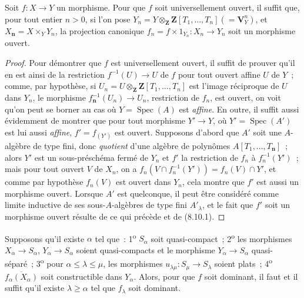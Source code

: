 \begin{corollary}[8.10.2]
\label{IV.8.10.2-fr}
Soit $f:X\to Y$ un morphisme. Pour que $f$ soit universellement ouvert, il
suffit que, pour tout entier $n>0$, si l'on pose
$Y_n=Y\otimes_{\mathbf Z}\mathbf Z[T_1,\ldots,T_n](=\mathbf V_Y^n)$, et
$X_{\boldsymbol{n}}=X\times_YY_n$, la projection canonique
$f_n=f\times1_{Y_n}:X_n\to Y_n$ soit un morphisme ouvert.
\end{corollary}

\begin{proof}
Pour démontrer que $f$ est universellement ouvert, il suffit de prouver qu'il
en est ainsi de la restriction $f^{-1}(U)\to U$ de $f$ pour tout ouvert affine
$U$ de $Y$~; comme, par hypothèse, si
$U_n=U\otimes_{\mathbf Z}\mathbf Z[T_1,\ldots,T_n]$ est l'image réciproque de
$U$ dans $Y_n$, le morphisme $f_{\boldsymbol{n}}^{-1}(U_n)\to U_n$, restriction de $f_n$, est
ouvert, on voit qu'on peut se borner au cas où $Y=\operatorname{Spec}(A)$ est
\emph{affine}. En outre, il suffit aussi évidemment de montrer que pour tout
morphisme $Y'\to Y$, où $Y'=\operatorname{Spec}(A')$ est lui aussi \emph{affine},
$f'=f_{(Y')}$ est ouvert. Supposons d'abord que $A'$ soit une $A$-algèbre de
type fini, donc \emph{quotient} d'une algèbre de polynômes $A[T_1,\ldots,T_{\boldsymbol{n}}]$~;
alors $Y'$ est un sous-préschéma fermé de $Y_n$ et $f'$ la
restriction de $f_n$ à $f_n^{-1}(Y')$~; mais pour tout ouvert $V$ de $X_n$,
on a $f_n(V\cap f_n^{-1}(Y'))=f_n(V)\cap Y'$, et comme par hypothèse $f_n(V)$
est ouvert dans $Y_n$, cela montre que $f'$ est aussi un morphisme ouvert.
Lorsque $A'$ est quelconque, il peut être considéré comme limite inductive de
ses sous-$A$-algèbres de type fini $A'_\lambda$, et le fait que $f'$ soit un
morphisme ouvert résulte de ce qui précède et de (8.10.1).
\end{proof}

\begin{proposition}[8.10.3]
Supposons qu'il existe $\alpha$ tel que~: 1\textsuperscript{o} $S_\alpha$ soit
quasi-compact~; 2\textsuperscript{o} les morphismes $X_\alpha\to S_\alpha$,
$Y_\alpha\to S_\alpha$ soient quasi-compacts et le morphisme
$Y_\alpha\to S_\alpha$ quasi-séparé~; 3\textsuperscript{o} pour
$\alpha\leq\lambda\leq\mu$, les morphismes
$u_{\lambda\mu}:S_\mu\to S_\lambda$ soient \textup{plats}~; 4\textsuperscript{o}
$\overline{f_\alpha(X_\alpha)}$ soit constructible dans $Y_\alpha$. Alors,
pour que $f$ soit dominant, il faut et il suffit qu'il existe
$\lambda\geq\alpha$ tel que $f_\lambda$ soit dominant.
\end{proposition}

